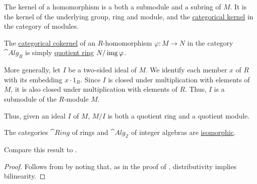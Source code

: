 \begin{definition}
\begin{thmenum}
    The kernel of a homomorphism is a both a submodule and a subring of \( M \). It is the kernel of the underlying group, ring and module, and the \hyperref[def:zero_morphisms/cokernel]{categorical kernel} in the category of modules.

     The \hyperref[def:zero_morphisms/cokernel]{categorical cokernel} of an \( R \)-homomorphism \( \varphi: M \to N \) in the category \( \cat{Alg}_R \) is simply \hyperref[def:ring/quotient]{quotient ring} \( N / \operatorname{img} \varphi \).

    More generally, let \( I \) be a two-sided ideal of \( M \). We identify each member \( x \) of \( R \) with its embedding \( x \cdot 1_R \). Since \( I \) is closed under multiplication with elements of \( M \), it is also closed under multiplication with elements of \( R \). Thus, \( I \) is a submodule of the \( R \)-module \( M \).

    Thus, given an ideal \( I \) of \( M \), \( M / I \) is both a quotient ring and a quotient module.
  \end{thmenum}
\end{definition}

\begin{proposition}\label{thm:ring_is_integer_algebra}
  The categories \( \hyperref[def:ring/category]{\cat{Ring}} \) of rings and \( \hyperref[def:algebra_over_ring/category]{\cat{Alg}_\BbbZ} \) of integer algebras are \hyperref[rem:category_similarity/isomorphism]{isomorphic}.

  Compare this result to .
\end{proposition}
\begin{proof}
  Follows from  by noting that, as in the proof of , distributivity implies bilinearity.
\end{proof}

